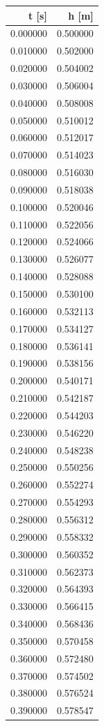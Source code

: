 \begin{tabular}{rr}
\toprule
t [s] & h [m] \\
\midrule
0.000000 & 0.500000 \\
0.010000 & 0.502000 \\
0.020000 & 0.504002 \\
0.030000 & 0.506004 \\
0.040000 & 0.508008 \\
0.050000 & 0.510012 \\
0.060000 & 0.512017 \\
0.070000 & 0.514023 \\
0.080000 & 0.516030 \\
0.090000 & 0.518038 \\
0.100000 & 0.520046 \\
0.110000 & 0.522056 \\
0.120000 & 0.524066 \\
0.130000 & 0.526077 \\
0.140000 & 0.528088 \\
0.150000 & 0.530100 \\
0.160000 & 0.532113 \\
0.170000 & 0.534127 \\
0.180000 & 0.536141 \\
0.190000 & 0.538156 \\
0.200000 & 0.540171 \\
0.210000 & 0.542187 \\
0.220000 & 0.544203 \\
0.230000 & 0.546220 \\
0.240000 & 0.548238 \\
0.250000 & 0.550256 \\
0.260000 & 0.552274 \\
0.270000 & 0.554293 \\
0.280000 & 0.556312 \\
0.290000 & 0.558332 \\
0.300000 & 0.560352 \\
0.310000 & 0.562373 \\
0.320000 & 0.564393 \\
0.330000 & 0.566415 \\
0.340000 & 0.568436 \\
0.350000 & 0.570458 \\
0.360000 & 0.572480 \\
0.370000 & 0.574502 \\
0.380000 & 0.576524 \\
0.390000 & 0.578547 \\

\end{tabular}
